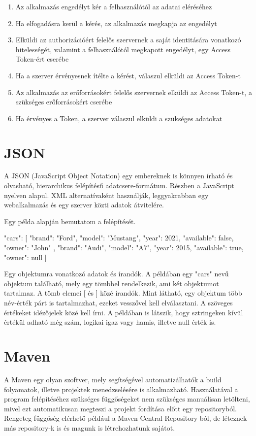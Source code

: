 \begin{enumerate}
\item Az alkalmazás engedélyt kér a felhasználótól az adatai eléréséhez 
\item Ha elfogadásra kerül a kérés, az alkalmazás megkapja az engedélyt 
\item Elküldi az authorizációért felelős szervernek a saját identitására vonatkozó hitelességét, valamint a felhasználótól megkapott engedélyt, egy Access Token-ért cserébe 
\item Ha a szerver érvényesnek ítélte a kérést, válaszul elküldi az Access Token-t 
\item Az alkalmazás az erőforrásokért felelős szervernek elküldi az Access Token-t, a szükséges erőforrásokért cserébe 
\item Ha érvényes a Token, a szerver válaszul elküldi a szükséges adatokat 
\end{enumerate}


\section{JSON}

A JSON (JavaScript Object Notation) egy embereknek is könnyen írható és olvasható, hierarchikus felépítésű adatcsere-formátum. Részben a JavaScript nyelven alapul. XML alternatívaként használják, leggyakrabban egy webalkalmazás és egy szerver közti adatok átvitelére. 

Egy példa alapján bemutatom a felépítését. 

{"cars": [{ 
"brand": "Ford", 
"model": "Mustang", 
"year": 2021, 
"available": false, 
"owner": "John" 
        }, { 
"brand": "Audi", 
"model": "A7", 
"year": 2015, 
"available": true, 
"owner": null 
        } 
]} 

Egy objektumra vonatkozó adatok { és } írandók. A példában egy "cars" nevű objektum található, mely egy tömbbel rendelkezik, ami két objektumot tartalmaz. A tömb elemei [ és ] közé írandók. Mint látható, egy objektum több név-érték párt is tartalmazhat, ezeket vesszővel kell elválasztani. A szöveges értékeket idézőjelek közé kell írni. A példában is látszik, hogy sztringeken kívül értékül adható még szám, logikai igaz vagy hamis, illetve null érték is. 

\section{Maven}

A Maven egy olyan szoftver, mely segítségével automatizálhatók a build folyamatok, illetve projektek menedzselésére is alkalmazható. Használatával a program felépítéséhez szükséges függőségeket nem szükséges manuálisan letölteni, mivel ezt automatikusan megteszi a projekt fordítása előtt egy repositoryból. Rengeteg függőség elérhető például a Maven Central Repository-ból, de léteznek más repository-k is és magunk is létrehozhatunk sajátot. 

